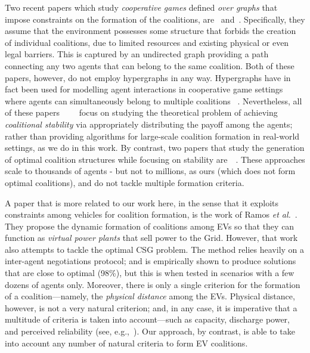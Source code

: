 Two recent papers which study {\em cooperative games} defined {\em over graphs} that impose constraints on the formation of the coalitions, are~\cite{chalkiadakis2016characteristic} and~\cite{chalkiadakis2012coalitional}. Specifically, they assume that the environment possesses some structure that forbids the creation of individual coalitions, due to limited resources and existing physical or even legal barriers. This is captured by an undirected graph providing a path connecting any two agents that can belong to the same coalition.
Both of these papers, however, do not employ hypergraphs in any way. Hypergraphs have in fact been used for modelling agent interactions in cooperative game settings where agents can simultaneously belong to multiple coalitions~\cite{jun2009hypergraph} \cite{zick2012overlapping}. Nevertheless, all of these papers~\cite{chalkiadakis2016characteristic}~\cite{chalkiadakis2012coalitional}~\cite{jun2009hypergraph}~\cite{zick2012overlapping} focus on studying the theoretical problem of achieving {\em coalitional stability} via appropriately distributing the payoff among the agents; rather than providing algorithms for large-scale coalition formation in real-world settings, as we do in this work. By contrast, two papers that study the generation of optimal coalition structures while focusing on stability are~\cite{bistaffa2014anytime}~\cite{voice2012coalition}. These approaches scale to thousands of agents - but not to millions, as ours (which does not form optimal coalitions), and do not tackle multiple formation criteria.

A paper that is more related to our work here, in the sense that it exploits constraints among vehicles for coalition formation, is the work of Ramos {\em et al.}~\cite{deORamos2014}. They propose the dynamic formation of coalitions among EVs so that they can function as {\em virtual power plants} that sell power to the Grid. However, that work also attempts to tackle the optimal CSG problem. The method relies heavily on a inter-agent negotiations protocol; and is empirically shown to produce solutions that are close to optimal (98\%), but this is when tested in scenarios with a few dozens of agents only. Moreover, there is only a single criterion for the formation of a coalition---namely, the {\em physical distance} among the EVs. Physical distance, however, is not a very natural criterion; and, in any case, it is imperative that a multitude of criteria is taken into account---such as capacity, discharge power, and perceived reliability (see, e.g.,~\cite{kamboj2011deploying}). Our approach, by contrast, is able to take into account any number of natural criteria to form EV coalitions.